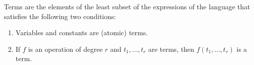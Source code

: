 Terms are the elements of the least subset of the expressions of the language that satisfies the following two conditions:
\begin{enumerate}
\item[(a)] Variables and constants are (atomic) terms.
\item[(b)] If $f$ is an operation of degree $r$ and $t_1, \ldots, t_r$ are terms, then $f(t_1, \ldots, t_r)$ is a term.
\end{enumerate}
